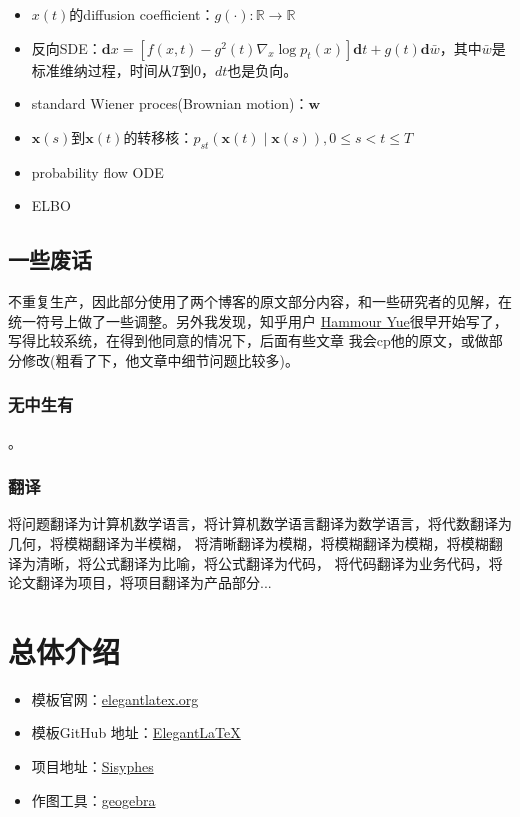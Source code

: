 \documentclass[lang=cn,newtx,10pt,scheme=chinese]{elegantbook}
\begin{document}
\begin{itemize}
    \item $x(t)$的diffusion coefficient：$g(\cdot):\mathbb{R} \rightarrow \mathbb{R}$
    \item 反向SDE：$\mathbf{d} x=\left[f(x, t)-g^2(t) \nabla_x \log p_t(x)\right] \mathbf{d} t+g(t) \mathbf{d} \bar{w}$，其中$\bar{w}$是标准维纳过程，时间从$T$到$0$，$dt$也是负向。
    \item standard Wiener proces(Brownian motion)：$\boldsymbol{w}$
    \item $\mathbf{x}(s)$到$\mathbf{x}(t)$的转移核：$p_{s t}(\mathbf{x}(t) \mid \mathbf{x}(s)),0 \leqslant s<t \leqslant T$
    \item probability flow ODE
    \item ELBO 

\end{itemize}
\section{一些废话}
不重复生产，因此部分使用了两个博客的原文部分内容，和一些研究者的见解，在统一符号上做了一些调整。另外我发现，知乎用户
\href{https://www.zhihu.com/people/bai-e-ji-wan-qi}{Hammour Yue}很早开始写了，写得比较系统，在得到他同意的情况下，后面有些文章
我会cp他的原文，或做部分修改(粗看了下，他文章中细节问题比较多)。
\subsection{无中生有}
。
\subsection{翻译}
将问题翻译为计算机数学语言，将计算机数学语言翻译为数学语言，将代数翻译为几何，将模糊翻译为半模糊，
将清晰翻译为模糊，将模糊翻译为模糊，将模糊翻译为清晰，将公式翻译为比喻，将公式翻译为代码，
将代码翻译为业务代码，将论文翻译为项目，将项目翻译为产品部分...

\chapter{总体介绍}

\begin{itemize}
  \item 模板官网：\href{https://elegantlatex.org/}{elegantlatex.org}
  \item 模板GitHub 地址：\href{https://github.com/ElegantLaTeX/}{ElegantLaTeX}
  \item 项目地址：\href{https://github.com/foocker}{Sisyphes}
  \item 作图工具：\href{https://www.geogebra.org/?lang=en}{geogebra}
\end{itemize}
\end{document}
